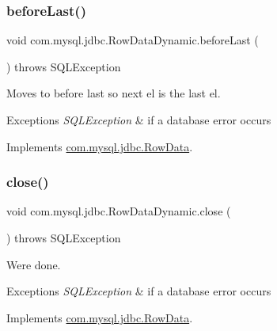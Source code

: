 \subsubsection{\texorpdfstring{before\+Last()}{beforeLast()}}
{\footnotesize\ttfamily void com.\+mysql.\+jdbc.\+Row\+Data\+Dynamic.\+before\+Last (\begin{DoxyParamCaption}{ }\end{DoxyParamCaption}) throws S\+Q\+L\+Exception}

Moves to before last so next el is the last el.


\begin{DoxyExceptions}{Exceptions}
{\em S\+Q\+L\+Exception} & if a database error occurs \\
\hline
\end{DoxyExceptions}


Implements \mbox{\hyperlink{interfacecom_1_1mysql_1_1jdbc_1_1_row_data_a64bc800ad28a97c6ad1f7d6a4958c187}{com.\+mysql.\+jdbc.\+Row\+Data}}.

\mbox{\label{classcom_1_1mysql_1_1jdbc_1_1_row_data_dynamic_a284d8e7db5b779d4c20de17f1f5b8c5c}} 
\subsubsection{\texorpdfstring{close()}{close()}}
{\footnotesize\ttfamily void com.\+mysql.\+jdbc.\+Row\+Data\+Dynamic.\+close (\begin{DoxyParamCaption}{ }\end{DoxyParamCaption}) throws S\+Q\+L\+Exception}

We\textquotesingle{}re done.


\begin{DoxyExceptions}{Exceptions}
{\em S\+Q\+L\+Exception} & if a database error occurs \\
\hline
\end{DoxyExceptions}


Implements \mbox{\hyperlink{interfacecom_1_1mysql_1_1jdbc_1_1_row_data_ac548da95fe41cee544964af3b6d734a6}{com.\+mysql.\+jdbc.\+Row\+Data}}.

